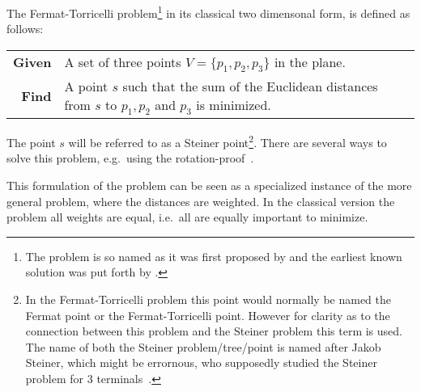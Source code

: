 The Fermat-Torricelli problem\footnote{The problem is so named as it was first
  proposed by \textcite{fermat1891} and the earliest known solution was put
  forth by \textcite{torricelli1919}.} in its classical two dimensonal form, is
defined as follows:
%
\begin{center}
  \begin{tabular}{rp{9cm}}
    \toprule
    \textbf{Given} & A set of three points $V = \{p_1, p_2, p_3\}$ in the plane. \\
    \textbf{Find}  & A point $s$ such that the sum of the Euclidean distances from
                     $s$ to $p_1, p_2$ and $p_3$ is minimized. \\
    \bottomrule
  \end{tabular}
\end{center}
%
The point $s$ will be referred to as a Steiner point\footnote{In the
  Fermat-Torricelli problem this point would normally be named the Fermat point
  or the Fermat-Torricelli point. However for clarity as to the connection
  between this problem and the Steiner problem this term is used. The name of
  both the Steiner problem/tree/point is named after Jakob Steiner, which might
  be errornous, who supposedly studied the Steiner problem for $3$
  terminals~\cite{brazil2014}.}. There are several ways to solve this problem,
e.g.\ using the rotation-proof~\cite[p.~3--5]{brazil2015}.

This formulation of the problem can be seen as a specialized instance of the
more general problem, where the distances are weighted. In the classical version
the problem all weights are equal, i.e.\ all are equally important to minimize.

